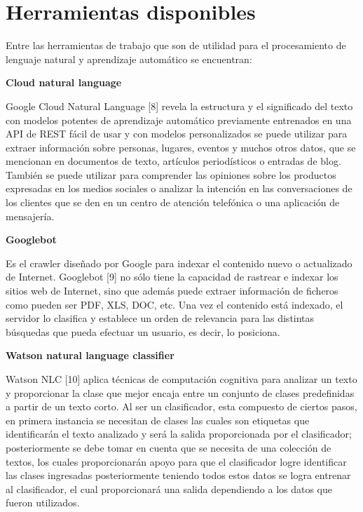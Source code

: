 \section{Herramientas disponibles}


Entre las herramientas de trabajo que son de utilidad para el procesamiento de lenguaje natural y aprendizaje automático se encuentran:\\

\begin{large}
	 \textbf{Cloud natural language}\\
\end{large}

Google Cloud Natural Language [8] revela la estructura y el significado del texto con modelos potentes de aprendizaje automático previamente entrenados en una API de REST fácil de usar y con modelos personalizados se puede utilizar para extraer información sobre personas, lugares, eventos y muchos otros datos, que se mencionan en documentos de texto, artículos periodísticos o entradas de blog. También se puede utilizar para comprender las opiniones sobre los productos expresadas en los medios sociales o analizar la intención en las conversaciones de los clientes que se den en un centro de atención telefónica o una aplicación de mensajería.\\

\begin{large}
	 \textbf{Googlebot}\\
\end{large}

Es el crawler diseñado por Google para indexar el contenido nuevo o actualizado de Internet.
Googlebot [9] no sólo tiene la capacidad de rastrear e indexar los sitios web de Internet, sino que además puede extraer información de ficheros como pueden ser PDF, XLS, DOC, etc.
Una vez el contenido está indexado, el servidor lo clasifica y establece un orden de relevancia para las distintas búsquedas que pueda efectuar un usuario, es decir, lo posiciona.\\



\begin{large}
	 \textbf{Watson natural language classifier}\\
\end{large}

Watson NLC [10] aplica técnicas de computación cognitiva para analizar un texto y proporcionar la clase que mejor encaja entre un conjunto de clases predefinidas a partir de un texto corto.
Al ser un clasificador, esta compuesto de ciertos pasos, en primera instancia se necesitan de clases las cuales son etiquetas que identificarán el texto analizado y será la salida proporcionada por el clasificador; posteriormente se debe tomar en cuenta que se necesita de una colección de textos, los cuales proporcionarán apoyo para que el clasificador logre identificar las clases ingresadas posteriormente teniendo todos estos datos se logra entrenar al clasificador, el cual proporcionará una salida dependiendo a los datos que fueron utilizados.


